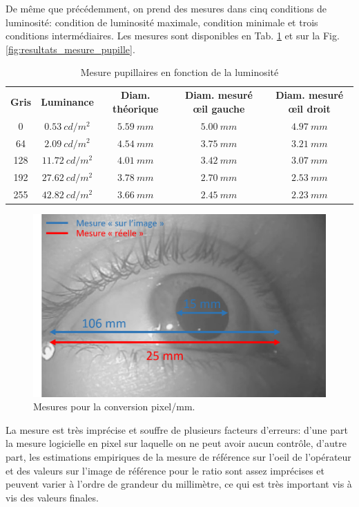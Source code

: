 	\par De même que précédemment, on prend des mesures	dans cinq conditions de luminosité: condition de luminosité maximale, condition minimale et trois conditions intermédiaires. Les mesures sont disponibles en Tab. \ref{tab:mesure_pupillaire} et sur la Fig. \ref{fig:resultats_mesure_pupille}.
	
	\begin{table}[h]	
		\centering
		\caption{Mesure pupillaires en fonction de la luminosité}
		\label{tab:mesure_pupillaire}
		\small
		\begin{tabular}{ccccc}
			\textbf{Gris} & \textbf{Luminance} & \textbf{Diam. théorique} & \textbf{Diam. mesuré œil gauche} & \textbf{Diam. mesuré œil droit}\\
			0 & $0.53~cd/m^2$ & $5.59~mm$ & $5.00~mm$ & $4.97~mm$\\
			64 & $2.09~cd/m^2$ & $4.54~mm$ & $3.75~mm$ & $3.21~mm$\\
			128 & $11.72~cd/m^2$ & $4.01~mm$ & $3.42~mm$ & $3.07~mm$\\
			192 & $27.62~cd/m^2$ & $3.78~mm$ & $2.70~mm$ & $2.53~mm$\\
			255 & $42.82~cd/m^2$ & $3.66~mm$ & $2.45~mm$ & $2.23~mm$\\
		\end{tabular}
	\end{table}
	
	\begin{figure}
		\centering
		\includegraphics[scale=.7]{Figures/MesureReferenceOeil}
		\caption{Mesures pour la conversion pixel/mm.}
		\label{fig:mesure_reference}
	\end{figure}
	
	\par La mesure est très imprécise et souffre de plusieurs facteurs d'erreurs: d'une part la mesure logicielle en pixel sur laquelle on ne peut avoir aucun contrôle, d'autre part, les estimations empiriques de la mesure de référence sur l'oeil de l'opérateur et des valeurs sur l'image de référence pour le ratio sont assez imprécises et peuvent varier à l'ordre de grandeur du millimètre, ce qui est très important vis à vis des valeurs finales.
	

